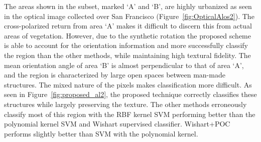 The areas shown in the subset, marked `A' and `B', are highly urbanized as seen in the optical image collected over San Francisco (Figure~\ref{fig:OpticalAlos2}).
The cross-polarized return from area `A' makes it difficult to discern this from actual areas of vegetation. However, due to the synthetic rotation the proposed scheme is able to account for the orientation information and more successfully classify the region than the other methods, while maintaining high textural fidelity. 
The mean orientation angle of area `B' is almost perpendicular to that of area `A', and the region is characterized by large open spaces between man-made structures. The mixed nature of the pixels makes classification more difficult. As seen in Figure~\ref{fig:proposed_al2}, the proposed technique correctly classifies these structures while largely preserving the texture. The other methods erroneously classify most of this region with the RBF kernel SVM performing  better than the polynomial kernel SVM and Wishart supervised classifier. Wishart+POC performs slightly better than SVM with the polynomial kernel.

